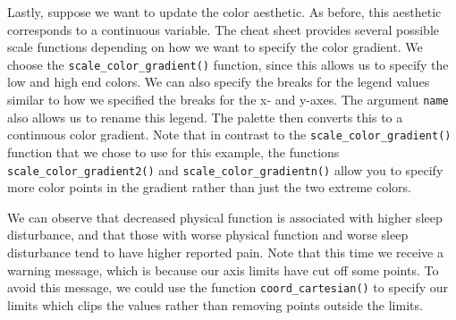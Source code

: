 \documentclass[
  letterpaper,
]{latex/krantz}
\begin{document}
Lastly, suppose we want to update the color aesthetic. As before, this
aesthetic corresponds to a continuous variable. The cheat sheet provides
several possible scale functions depending on how we want to specify the
color gradient. We choose the
\texttt{scale\_color\_gradient()}
function, since this allows us to specify the low and high end colors.
We can also specify the breaks for the legend values similar to how we
specified the breaks for the x- and y-axes. The argument \texttt{name}
also allows us to rename this legend. The palette then converts this to
a continuous color gradient. Note that in contrast to the
\texttt{scale\_color\_gradient()} function that we chose to use for this
example, the functions
\texttt{scale\_color\_gradient2()}
and
\texttt{scale\_color\_gradientn()}
allow you to specify more color points in the gradient rather than just
the two extreme colors.

We can observe that decreased physical function is associated with
higher sleep disturbance, and that those with worse physical function
and worse sleep disturbance tend to have higher reported pain. Note that
this time we receive a warning message, which is because our axis limits
have cut off some points. To avoid this message, we could use the
function
\texttt{coord\_cartesian()}
to specify our limits which clips the values rather than removing points
outside the limits.
\end{document}
